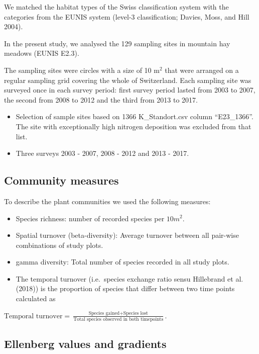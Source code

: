 \documentclass[fleqn,10pt,lineno]{wlpeerj} %
\providecommand{\tightlist}{
\setlength{\itemsep}{0pt}\setlength{\parskip}{0pt}}
\theoremstyle{definition}
\theoremstyle{definition}
\theoremstyle{definition}
\theoremstyle{remark}
\begin{document}
We matched the habitat types of the Swiss classification system with the
categories from the EUNIS system (level-3 classification; Davies, Moss,
and Hill 2004).

In the present study, we analysed the 129 sampling sites in mountain hay
meadows (EUNIS E2.3).

The sampling sites were circles with a size of 10 m\(^2\) that were
arranged on a regular sampling grid covering the whole of Switzerland.
Each sampling site was surveyed once in each survey period: first survey
period lasted from 2003 to 2007, the second from 2008 to 2012 and the
third from 2013 to 2017.

\begin{itemize}
\tightlist
\item
  Selection of sample sites based on 1366 K\_Standort.csv column
  ``E23\_1366''. The site with exceptionally high nitrogen deposition
  was excluded from that list.
\item
  Three surveys 2003 - 2007, 2008 - 2012 and 2013 - 2017.
\end{itemize}

\subsection*{Community measures}\label{community-measures}

To describe the plant communities we used the following measures:

\begin{itemize}
\tightlist
\item
  Species richness: number of recorded species per \(10m^2\).
\item
  Spatial turnover (beta-diversity): Average turnover between all
  pair-wise combinations of study plots.
\item
  gamma diversity: Total number of species recorded in all study plots.
\item
  The temporal turnover (i.e.~species exchange ratio sensu Hillebrand et
  al. (2018)) is the proportion of species that differ between two time
  points calculated as
\end{itemize}

\(\text{Temporal turnover} = \frac{\text{Species gained} + \text{Species lost}}{\text{Total species observed in both timepoints}}\).

\subsection*{Ellenberg values and
gradients}\label{ellenberg-values-and-gradients}
\end{document}
